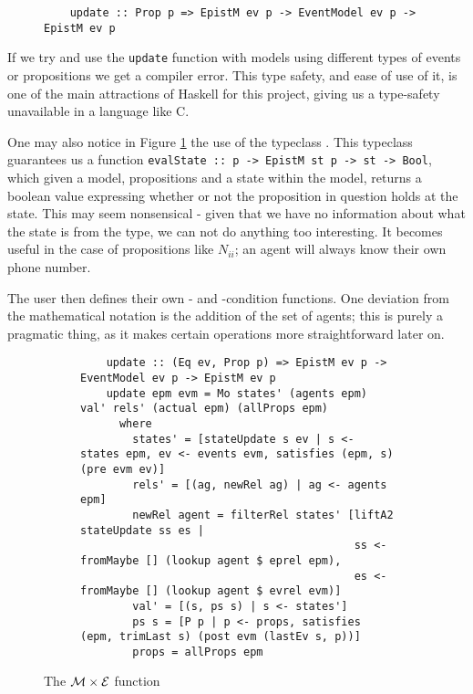 \documentclass[10pt, a4paper]{report}
\begin{document}
\begin{figure}[h]
  \centering
  \begin{verbatim}
    update :: Prop p => EpistM ev p -> EventModel ev p -> EpistM ev p
\end{verbatim}
  \caption{}
  \label{fig:UpdateType}
\end{figure}

If we try and use the \texttt{update} function with models using
different types of events or propositions we get a compiler error. This type
safety, and ease of use of it, is one of the main attractions of Haskell for
this project, giving us a type-safety unavailable in a language like C.

One may also notice in Figure \ref{fig:UpdateType} the use of the typeclass
. This typeclass guarantees us a function
\texttt{evalState :: p -> EpistM st p -> st -> Bool}, which given a
model, propositions and a state within the model, returns a boolean value
expressing whether or not the proposition in question holds at the state. This may
seem nonsensical - given that we have no information about what the state is
from the type, we can not do anything too interesting. It becomes
useful in the case of propositions like $N_{ii}$; an agent will always know
their own phone number.

The user then defines their own \tpre- and \tpost-condition functions. One
deviation from the mathematical notation is the addition of the set of agents;
this is purely a pragmatic thing, as it makes certain operations more
straightforward later on.

\begin{figure}[h]
  \begin{subfigure}[b]{0.5\textwidth}
  \begin{verbatim}
    update :: (Eq ev, Prop p) => EpistM ev p -> EventModel ev p -> EpistM ev p
    update epm evm = Mo states' (agents epm) val' rels' (actual epm) (allProps epm)
      where
        states' = [stateUpdate s ev | s <- states epm, ev <- events evm, satisfies (epm, s) (pre evm ev)]
        rels' = [(ag, newRel ag) | ag <- agents epm]
        newRel agent = filterRel states' [liftA2 stateUpdate ss es |
                                          ss <- fromMaybe [] (lookup agent $ eprel epm),
                                          es <- fromMaybe [] (lookup agent $ evrel evm)]
        val' = [(s, ps s) | s <- states']
        ps s = [P p | p <- props, satisfies (epm, trimLast s) (post evm (lastEv s, p))]
        props = allProps epm
  \end{verbatim}
\end{subfigure}
\caption{The $\mathcal{M} \times \mathcal{E}$ function}
\label{fig:update}
\end{figure}
\end{document}
